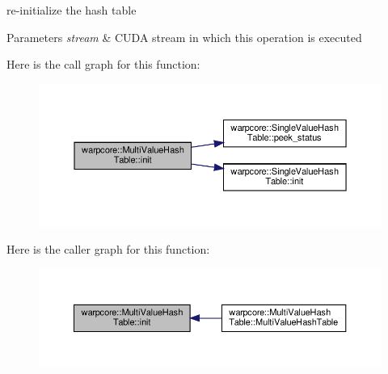 re-\/initialize the hash table 


\begin{DoxyParams}{Parameters}
{\em stream} & C\+U\+DA stream in which this operation is executed \\
\hline
\end{DoxyParams}
Here is the call graph for this function\+:
\nopagebreak
\begin{figure}[H]
\begin{center}
\leavevmode
\includegraphics[width=350pt]{classwarpcore_1_1MultiValueHashTable_a8a13707d263729d8ab1ed146ce487309_cgraph}
\end{center}
\end{figure}
Here is the caller graph for this function\+:
\nopagebreak
\begin{figure}[H]
\begin{center}
\leavevmode
\includegraphics[width=350pt]{classwarpcore_1_1MultiValueHashTable_a8a13707d263729d8ab1ed146ce487309_icgraph}
\end{center}
\end{figure}
\mbox{\label{classwarpcore_1_1MultiValueHashTable_a7f579f9cd29c3b210bd8b6b02af8fcb9}} 

